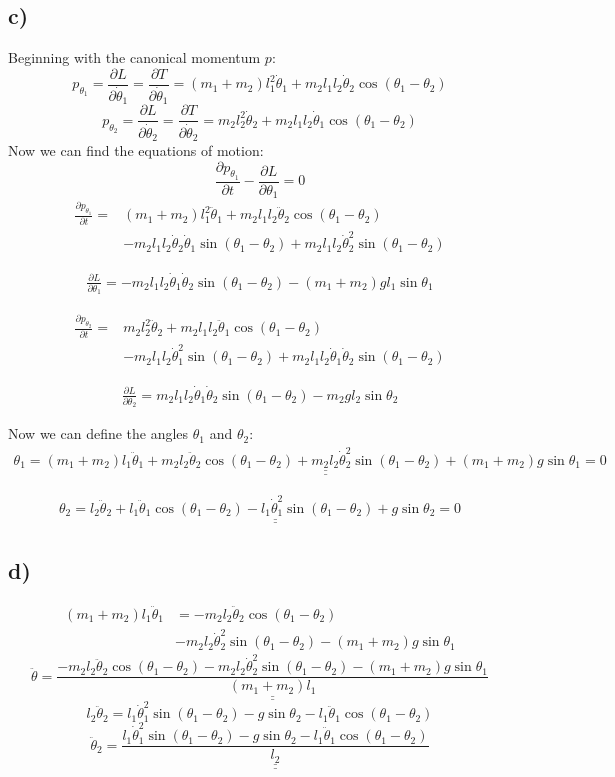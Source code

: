 \documentclass{article}
\begin{document}
\subsection*{c)}
Beginning with the canonical momentum $p$:
\[
p_{θ_1} = \frac{∂ L}{∂ \dot{θ}_1} = \frac{∂ T}{∂ \dot{θ}_1} = (m_1 + m_2) l_1^2 \dot{θ}_1 + m_2 l_1 l_2 \dot{θ}_2 \cos(θ_1 - θ_2)
\]
\[
p_{θ_2} = \frac{∂ L}{∂ \dot{θ}_2} = \frac{∂ T}{∂ \dot{θ}_2} = m_2 l_2^2 \dot{θ}_2 + m_2 l_1 l_2 \dot{θ}_1 \cos(θ_1 - θ_2) 
\]
Now we can find the equations of motion:
\[
\frac{∂ p_{θ_1}}{∂ t} - \frac{∂ L}{∂ θ_1} = 0
\]
\begin{align*}
\frac{∂ p_{θ_1}}{∂ t} = &(m_1 + m_2) l_1^2 \ddot{θ}_1 + m_2 l_1 l_2 \ddot{θ}_2 \cos(θ_1 - θ_2)\\ &- m_2 l_1 l_2 \dot{θ}_2 \dot{θ}_1 \sin(θ_1 - θ_2) + m_2 l_1 l_2 \dot{θ}_2^2 \sin(θ_1 - θ_2)
\end{align*}

\begin{align*}
\frac{∂ L}{∂ θ_1} = -m_2l_1l_2\dot{θ}_1\dot{θ}_2\sin(θ_1 - θ_2) - (m_1 + m_2)gl_1\sin θ_1
\end{align*}

\begin{align*}
\frac{∂ p_{θ_2}}{∂ t} = &m_2 l_2^2 \ddot{θ}_2 + m_2 l_1 l_2 \ddot{θ}_1 \cos(θ_1 - θ_2)\\ &- m_2 l_1 l_2 \dot{θ}_1^2 \sin(θ_1 - θ_2) + m_2 l_1 l_2 \dot{θ}_1 \dot{θ}_2 \sin(θ_1 - θ_2)
\end{align*}

\begin{align*}
\frac{∂ L}{∂ θ_2} = m_2l_1l_2\dot{θ}_1\dot{θ}_2\sin(θ_1 - θ_2) - m_2gl_2\sin θ_2
\end{align*}

Now we can define the angles $θ_1$ and $θ_2$:
\begin{align*}
θ_1 = \underline{\underline{(m_1 + m_2)l_1 \ddot{θ}_1 + m_2 l_2 \ddot{θ}_2 \cos(θ_1 - θ_2)   + m_2 l_2 \dot{θ}_2^2 \sin(θ_1 - θ_2) + (m_1 + m_2) g \sin θ_1 = 0}}
\end{align*}

\begin{align*}
θ_2 = \underline{\underline{l_2\ddot{θ}_2 + l_1 \ddot{θ}_1 \cos(θ_1 - θ_2) - l_1 \dot{θ}_1^2 \sin(θ_1 - θ_2) + g \sin θ_2 = 0}}
\end{align*}

\subsection*{d)}
\begin{align*}
(m_1 + m_2) l_1 \ddot{θ}_1 &= -m_2l_2\ddot{θ}_2\cos(θ_1 - θ_2) \\ &- m_2l_2\dot{θ}_2^2\sin(θ_1 - θ_2) - (m_1 + m_2) g \sin θ_1
\end{align*}
\[
\ddot{θ} = \underline{\underline{ \frac{-m_2l_2\ddot{θ}_2\cos(θ_1 - θ_2) - m_2l_2\dot{θ}_2^2\sin(θ_1 - θ_2) - (m_1 + m_2) g \sin θ_1}{(m_1 + m_2) l_1}}}
\]
\[
l_2 \ddot{θ}_2 = l_1 \dot{θ}_1^2 \sin(θ_1 - θ_2) - g \sin θ_2 - l_1 \ddot{θ}_1 \cos(θ_1 - θ_2)
\]
\[
\ddot{θ}_2 = \underline{\underline{\frac{l_1 \dot{θ}_1^2 \sin(θ_1 - θ_2) - g \sin θ_2 - l_1 \ddot{θ}_1 \cos(θ_1 - θ_2)}{l_2}}}
\]
\end{document}

